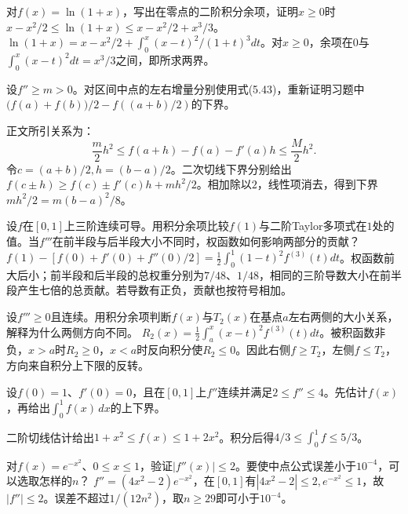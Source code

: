 对\(f(x)=\ln(1+x)\)，写出在零点的二阶积分余项，证明\(x\ge0\)时\(x-x^2/2\le\ln(1+x)\le x-x^2/2+x^3/3\)。
\solutionanswer
\(\ln(1+x)=x-x^2/2+\int_0^x(x-t)^2/(1+t)^3dt\)。对\(x\ge0\)，余项在\(0\)与\(\int_0^x(x-t)^2dt=x^3/3\)之间，即所求两界。


设\(f''\ge m>0\)。对区间中点的左右增量分别使用式\textup{(5.43)}，重新证明习题中\(\bigl(f(a)+f(b)\bigr)/2-f((a+b)/2)\)的下界。

\par\smallskip\noindent 正文所引关系为：
\begin{equation*}
\frac m2h^2\le f(a+h)-f(a)-f'(a)h\le\frac M2h^2.
\end{equation*}
\solutionanswer
令\(c=(a+b)/2,h=(b-a)/2\)。二次切线下界分别给出\(f(c\pm h)\ge f(c)\pm f'(c)h+mh^2/2\)。相加除以\(2\)，线性项消去，得到下界\(mh^2/2=m(b-a)^2/8\)。


设\(f\)在\([0,1]\)上三阶连续可导。用积分余项比较\(f(1)\)与二阶Taylor多项式在\(1\)处的值。当\(f'''\)在前半段与后半段大小不同时，权函数如何影响两部分的贡献？
\solutionanswer
\(f(1)-[f(0)+f'(0)+f''(0)/2]=\frac12\int_0^1(1-t)^2 f^{(3)}(t)dt\)。权函数前大后小；前半段和后半段的总权重分别为\(7/48\)、\(1/48\)，相同的三阶导数大小在前半段产生七倍的总贡献。若导数有正负，贡献也按符号相加。


设\(f'''\ge0\)且连续。用积分余项判断\(f(x)\)与\(T_2(x)\)在基点\(a\)左右两侧的大小关系，解释为什么两侧方向不同。
\solutionanswer
\(R_2(x)=\frac12\int_a^x(x-t)^2f^{(3)}(t)dt\)。被积函数非负，\(x>a\)时\(R_2\ge0\)，\(x<a\)时反向积分使\(R_2\le0\)。因此右侧\(f\ge T_2\)，左侧\(f\le T_2\)，方向来自积分上下限的反转。


设\(f(0)=1\)、\(f'(0)=0\)，且在\([0,1]\)上\(f''\)连续并满足\(2\le f''\le4\)。先估计\(f(x)\)，再给出\(\int_0^1f(x)\,dx\)的上下界。
\par
\solutionanswer
二阶切线估计给出\(1+x^2\le f(x)\le1+2x^2\)。积分后得\(4/3\le\int_0^1f\le5/3\)。


对\(f(x)=e^{-x^2}\)、\(0\le x\le1\)，验证\(|f''(x)|\le2\)。要使中点公式误差小于\(10^{-4}\)，可以选取怎样的\(n\)？
\solutionanswer
\(f''=(4x^2-2)e^{-x^2}\)，在\([0,1]\)有\(|4x^2-2|\le2,e^{-x^2}\le1\)，故\(|f''|\le2\)。误差不超过\(1/(12n^2)\)，取\(n\ge29\)即可小于\(10^{-4}\)。


